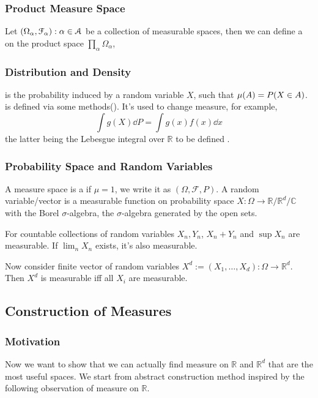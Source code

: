 \subsubsection{Product Measure Space}

Let \(\pqty{\Omega_{\alpha}, \mathcal{F}_{\alpha}}: \alpha\in \mathcal{A} \) be a collection of measurable spaces, then we can define a  on the product space \(\prod_{\alpha} \Omega_{\alpha}\),  

\subsubsection{Distribution and Density}

 is the probability induced by a random variable \(X\), such that \(\mu(A) = P\pqty{X \in A}\).  is defined via some methods(). It's used to change measure, for example,
\begin{equation*}
    \int g(X) \dd{P} = \int g(x)f(x)\dd{x}
\end{equation*}
the latter being the Lebesgue integral over \(\mathbb{R}\) to be defined .

\subsubsection{Probability Space and Random Variables}

A measure space is a  if \(\mu =1\), we write it as \((\Omega, \mathcal{F}, P)\). A random variable/vector is a measurable function on probability space \(X: \Omega \to \mathbb{R}/\mathbb{R}^{d}/\mathbb{C}\) with the Borel \(\sigma\)-algebra, the \(\sigma\)-algebra generated by the open sets.

For countable collections of random variables \(X_{n}, Y_{n}\), \(X_{n} +Y_{n}\) and \(\sup X_{n}\) are measurable. If \(\lim_{n} X_{n}\) exists, it's also measurable.

Now consider finite vector of random variables \(X^{d} := (X_{1}, \dots,X_{d}) : \Omega \to \mathbb{R}^{d}\). Then \(X^{d}\) is measurable iff all \(X_{i}\) are measurable. 

\subsection{Construction of Measures}

\subsubsection{Motivation}
Now we want to show that we can actually find measure on \(\mathbb{R}\) and \(\mathbb{R}^{d}\) that are the most useful spaces. We start from abstract construction method inspired by the following observation of measure on \(\mathbb{R}\).

